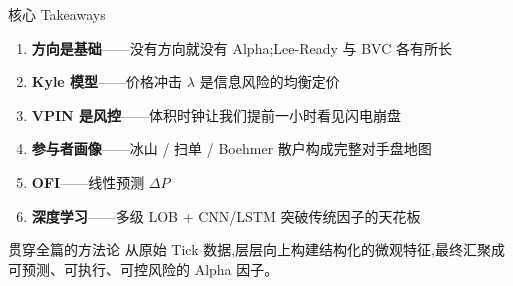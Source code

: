 \documentclass[10pt,aspectratio=169]{beamer}
\begin{document}
\begin{frame}{核心 Takeaways}

  \begin{enumerate}
    \item \textbf{方向是基础}——没有方向就没有 Alpha;Lee-Ready 与 BVC 各有所长

    \item \textbf{Kyle 模型}——价格冲击 $\lambda$ 是信息风险的均衡定价

    \item \textbf{VPIN 是风控}——体积时钟让我们提前一小时看见闪电崩盘

    \item \textbf{参与者画像}——冰山 / 扫单 / Boehmer 散户构成完整对手盘地图

    \item \textbf{OFI}——线性预测 $\Delta P$ 

    \item \textbf{深度学习}——多级 LOB + CNN/LSTM 突破传统因子的天花板
  \end{enumerate}

  \vfill

  \begin{alertblock}{贯穿全篇的方法论}
    从原始 Tick 数据,层层向上构建结构化的微观特征,最终汇聚成可预测、可执行、可控风险的 Alpha 因子。
  \end{alertblock}

\end{frame}
\end{document}
